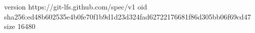 version https://git-lfs.github.com/spec/v1
oid sha256:ed48b602535e4b0fe70f1b9d1d23d324fad62722176681f86d305bb06f69cd47
size 16480
